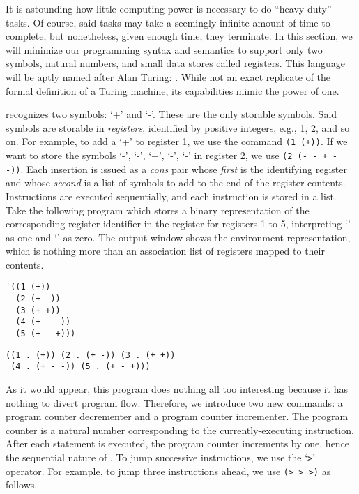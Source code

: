 It is astounding how little computing power is necessary to do ``heavy-duty'' tasks. Of course, said tasks may take a seemingly infinite amount of time to complete, but nonetheless, given enough time, they terminate. In this section, we will minimize our programming syntax and semantics to support only two symbols, natural numbers, and small data stores called registers. This language will be aptly named after Alan Turing: . While not an exact replicate of the formal definition of a Turing machine, its capabilities mimic the power of one.

 recognizes two symbols: `+' and `-'. These are the only storable symbols. Said symbols are storable in \textit{registers}, identified by positive integers, e.g., 1, 2, and so on. For example, to add a `+' to register 1, we use the command \texttt{(1 (+))}. If we want to store the symbols `-', `-', `+', `-', `-' in register 2, we use \texttt{(2 (- - + - -))}. Each insertion is issued as a \textit{cons} pair whose \textit{first} is the identifying register and whose \textit{second} is a list of symbols to add to the end of the register contents. Instructions are executed sequentially, and each instruction is stored in a list. Take the following program which stores a binary representation of the corresponding register identifier in the register for registers 1 to 5, interpreting `\ttt{+}' as one and `\ttt{-}' as zero. The output window shows the environment representation, which is nothing more than an association list of registers mapped to their contents. 

\begin{cloast}[]{}
\begin{lstlisting}[language=MyNLNScheme]
'((1 (+))
  (2 (+ -))
  (3 (+ +))
  (4 (+ - -))
  (5 (+ - +)))
\end{lstlisting}
\tcblower
\begin{lstlisting}[language=MyOutput]
((1 . (+)) (2 . (+ -)) (3 . (+ +)) 
 (4 . (+ - -)) (5 . (+ - +)))
\end{lstlisting}
\end{cloast}

As it would appear, this program does nothing all too interesting because it has nothing to divert program flow. Therefore, we introduce two new commands: a program counter decrementer and a program counter incrementer. The program counter is a natural number corresponding to the currently-executing instruction. After each statement is executed, the program counter increments by one, hence the sequential nature of . To jump successive instructions, we use the `\texttt{>}' operator. For example, to jump three instructions ahead, we use \texttt{(> > >)} as follows.

